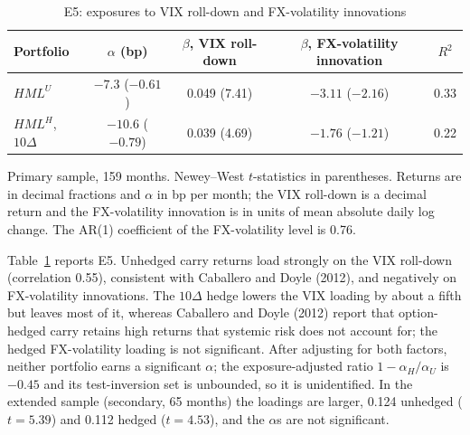 \documentclass[11pt]{article}
\theoremstyle{result}
\newcommand{\HML}{\mathit{HML}}
\newcommand{\D}{\Delta}
\begin{document}
\begin{table}[t]
\centering\small
\caption{E5: exposures to VIX roll-down and FX-volatility innovations}\label{tab:e5}
\begin{tabular}{lcccc}
\toprule
Portfolio & $\alpha$ (bp) & $\beta$, VIX roll-down & $\beta$, FX-volatility innovation & $R^2$ \\
\midrule
$\HML^U$ & $-7.3$ ($-0.61$) & 0.049 (7.41) & $-3.11$ ($-2.16$) & 0.33 \\
$\HML^H$, $10\D$ & $-10.6$ ($-0.79$) & 0.039 (4.69) & $-1.76$ ($-1.21$) & 0.22 \\
\bottomrule
\end{tabular}
\par\medskip
\begin{minipage}{0.9\linewidth}\footnotesize
Primary sample, 159 months. Newey--West $t$-statistics in parentheses. Returns are in decimal fractions and $\alpha$ in bp per month; the VIX roll-down is a decimal return and the FX-volatility innovation is in units of mean absolute daily log change. The AR(1) coefficient of the FX-volatility level is 0.76.
\end{minipage}
\end{table}

Table~\ref{tab:e5} reports E5. Unhedged carry returns load strongly on the VIX roll-down (correlation 0.55), consistent with Caballero and Doyle (2012), and negatively on FX-volatility innovations. The $10\D$ hedge lowers the VIX loading by about a fifth but leaves most of it, whereas Caballero and Doyle (2012) report that option-hedged carry retains high returns that systemic risk does not account for; the hedged FX-volatility loading is not significant. After adjusting for both factors, neither portfolio earns a significant $\alpha$; the exposure-adjusted ratio $1-\alpha_H/\alpha_U$ is $-0.45$ and its test-inversion set is unbounded, so it is unidentified. In the extended sample (secondary, 65 months) the loadings are larger, 0.124 unhedged ($t=5.39$) and 0.112 hedged ($t=4.53$), and the $\alpha$s are not significant.
\end{document}

